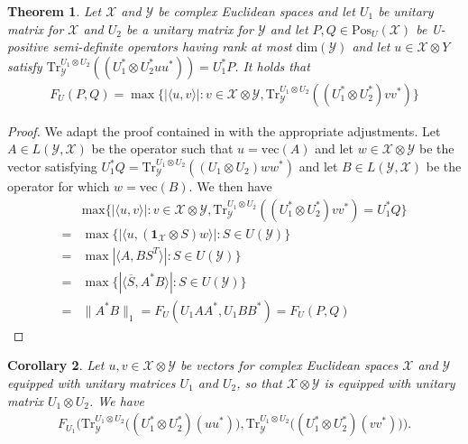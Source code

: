 \documentclass{amsart}
\numberwithin{equation}{section}
\newtheorem{theorem}{Theorem}[section]
\newtheorem{corollary}[theorem]{Corollary}
\theoremstyle{definition}
\theoremstyle{plain}
\theoremstyle{solutionstyle}
\begin{document}
\begin{theorem}
    Let $\mathcal{X}$ and $\mathcal{Y}$ be complex Euclidean spaces and let $U_1$ be unitary matrix for $\mathcal{X}$ and $U_2$ be a unitary matrix for $\mathcal{Y}$ and let $P,Q\in \mathrm{Pos}_U(\mathcal{X})$ be U-positive semi-definite operators having rank at most $\mathrm{dim}(\mathcal{Y})$ and let $u\in \mathcal{X}\otimes {Y}$ satisfy $\mathrm{Tr}^{U_1\otimes U_2}_{\mathcal{Y}}((U_1^*\otimes U_2^*uu^*))=U_1^*P$. It holds that 
    \begin{align*}
        F_U(P,Q)=\max\{|\langle u, v\rangle|:v\in \mathcal{X}\otimes \mathcal{Y}, \mathrm{Tr}_{\mathcal{Y}}^{U_1\otimes U_2}((U_1^*\otimes U_2^*)vv^*) \}
    \end{align*}
\end{theorem}
\begin{proof} We adapt the proof contained in \cite{Watrous_2018} with the appropriate adjustments. 
    Let $A\in L(\mathcal{Y},\mathcal{X})$ be the operator such that $u=\mathrm{vec}(A)$ and let $w\in \mathcal{X}\otimes \mathcal{Y}$ be the vector satisfying $U^*_1Q=\mathrm{Tr}_{\mathcal{Y}}^{U_1\otimes U_2}((U_1\otimes U_2)ww^*)$ and let $B\in L(\mathcal{Y},\mathcal{X})$ be the operator for which $w=\mathrm{vec}(B)$. We then have 
    \begin{align*}
        &\mathrm{max}\{|\langle u,v\rangle|: v\in \mathcal{X}\otimes \mathcal{Y}, \mathrm{Tr}_{\mathcal{Y}}^{U_1\otimes U_2}((U_1^*\otimes U_2^*)vv^*)=U_1^*Q\}\\
        =& \max\{|\langle u, (\mathbf{1}_{\mathcal{X}}\otimes S)w\rangle| :S\in U(\mathcal{Y})\}\\
        =&\max{|\langle A,BS^T\rangle|:S\in U(\mathcal{Y})}\}\\
        =& \max\{|\langle \overline{S}, A^*B\rangle|:S\in U(\mathcal{Y})\}\\
        =&\|A^*B\|_1=F_{U}(U_1AA^*,U_1BB^*)=F_{U}(P,Q)
    \end{align*}
\end{proof}
\begin{corollary}
Let $u, v \in \mathcal{X} \otimes \mathcal{Y}$ be vectors for complex Euclidean spaces $\mathcal{X}$ and $\mathcal{Y}$ equipped with unitary matrices $U_1$ and $U_2$, so that $\mathcal{X} \otimes \mathcal{Y}$ is equipped with unitary matrix $U_1 \otimes U_2$. We have
\begin{align*}
F_{U_1}\Big(
\mathrm{Tr}_{\mathcal{Y}}^{U_1 \otimes U_2}\big((U^*_1 \otimes U^*_2)(uu^*)\big),
\mathrm{Tr}_{\mathcal{Y}}^{U_1 \otimes U_2}\big((U^*_1 \otimes U^*_2)(vv^*)\big)
\Big).
\end{align*}
\end{corollary}
\end{document}
